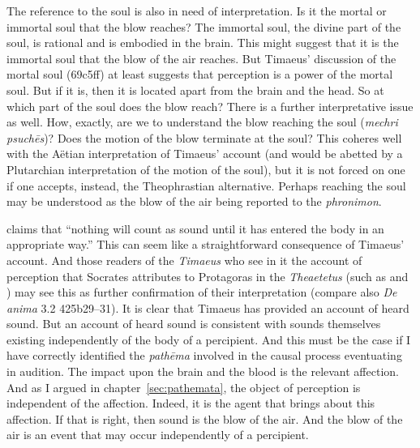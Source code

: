 The reference to the soul is also in need of interpretation. Is it the mortal or immortal soul that the blow reaches? The immortal soul, the divine part of the soul, is rational and is embodied in the brain. This might suggest that it is the immortal soul that the blow of the air reaches. But Timaeus' discussion of the mortal soul (69c5ff) at least suggests that perception is a power of the mortal soul. But if it is, then it is located apart from the brain and the head. So at which part of the soul does the blow reach? There is a further interpretative issue as well. How, exactly, are we to understand the blow reaching the soul (\emph{mechri psuchēs})? Does the motion of the blow terminate at the soul? This coheres well with the Aëtian interpretation of Timaeus' account (and would be abetted by a Plutarchian interpretation of the motion of the soul), but it is not forced on one if one accepts, instead, the Theophrastian alternative. Perhaps reaching the soul may be understood as the blow of the air being reported to the \emph{phronimon}. 

\citet[86]{Barker:2000dy} claims that ``nothing will count as sound until it has entered the body in an appropriate way.'' This can seem like a straightforward consequence of Timaeus' account. And those readers of the \emph{Timaeus} who see in it the account of perception that Socrates attributes to Protagoras in the \emph{Theaetetus} (such as \citealt{Cornford:1935fk} and \citealt{Kahn:2013ob}) may see this as further confirmation of their interpretation (compare also \emph{De anima} 3.2 425b29--31). It is clear that Timaeus has provided an account of heard sound. But an account of heard sound is consistent with sounds themselves existing independently of the body of a percipient. And this must be the case if I have correctly identified the \emph{pathēma} involved in the causal process eventuating in audition. The impact upon the brain and the blood is the relevant affection. And as I argued in chapter~\ref{sec:pathemata}, the object of perception is independent of the affection. Indeed, it is the agent that brings about this affection. If that is right, then sound is the blow of the air. And the blow of the air is an event that may occur independently of a percipient.


